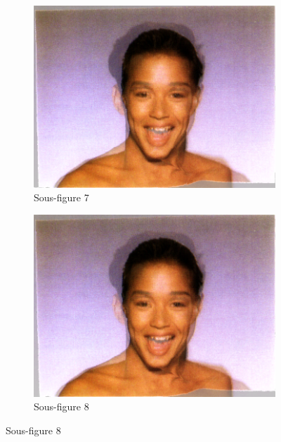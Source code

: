 \begin{figure}[h!]
    \begin{subfigure}{0.45\textwidth}
        \includegraphics[width=\textwidth]{img/testvisuel/frame6.png}
        \caption{Sous-figure 7}
    \end{subfigure}
    \hfill
    \begin{subfigure}{0.45\textwidth}
        \includegraphics[width=\textwidth]{img/testvisuel/frame7.png}
        \caption{Sous-figure 8}
    \end{subfigure}
    

\end{figure}
